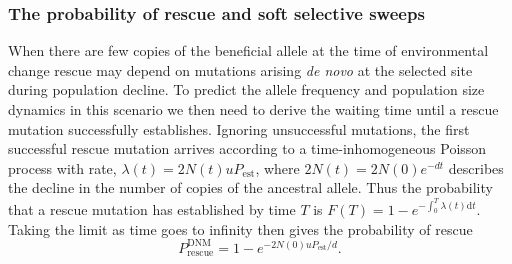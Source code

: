 \documentclass[]{article}
\begin{document}
\subsubsection*{The probability of rescue and soft selective sweeps}

When there are few copies of the beneficial allele at the time of environmental change rescue may depend on mutations arising \textit{de novo} at the selected site during population decline.
To predict the allele frequency and population size dynamics in this scenario we then need to derive the waiting time until a rescue mutation successfully establishes.
Ignoring unsuccessful mutations, the first successful rescue mutation arrives according to a time-inhomogeneous Poisson process with rate, $\lambda(t) = 2 N(t) u P_\mathrm{est}$, where $2N(t) = 2N(0) e^{-d t}$ describes the decline in the number of copies of the ancestral allele.
Thus the probability that a rescue mutation has established by time $T$ is $F(T) = 1-e^{-\int_0^T \lambda(t) \mathrm{d}t}$.
Taking the limit as time goes to infinity then gives the probability of rescue \citep[c.f., equation 10 in][]{orr2008population}
\begin{equation}
P_{\mathrm{rescue}}^{\mathrm{DNM}} = 1 - e^{-2 N(0) u P_\mathrm{est} / d}.
\end{equation}
\end{document}

